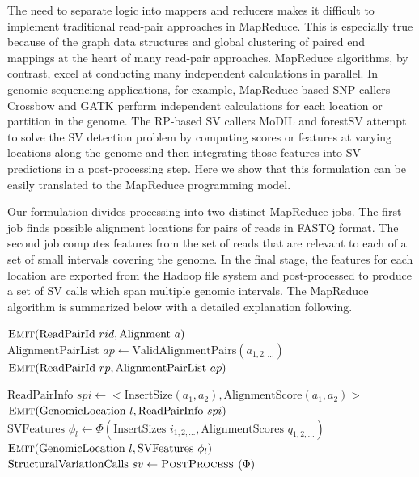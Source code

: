 \documentclass[11pt]{article}
\begin{document}
The need to separate logic into mappers and reducers makes it difficult to implement traditional read-pair approaches in MapReduce. This is especially true because of the graph data structures and global clustering of paired end mappings at the heart of many read-pair approaches. MapReduce algorithms, by contrast, excel at conducting many independent calculations in parallel. In genomic sequencing applications, for example, MapReduce based SNP-callers Crossbow \autocite{Langmead:2009p1225} and GATK \autocite{McKenna:2010p1051} perform independent calculations for each location or partition in the genome. The RP-based SV callers MoDIL \autocite{Lee:2009da} and forestSV \autocite{Michaelson:2012fj} attempt to solve the SV detection problem by computing scores or features at varying locations along the genome and then integrating those features into SV predictions in a post-processing step. Here we show that this formulation can be easily translated to the MapReduce programming model.

Our formulation divides processing into two distinct MapReduce jobs. The first job finds possible alignment locations for pairs of reads in FASTQ format. The second job computes features from the set of reads that are relevant to each of a set of small intervals covering the genome. In the final stage, the features for each location are exported from the Hadoop file system and post-processed to produce a set of SV calls which span multiple genomic intervals. The MapReduce algorithm is summarized below with a detailed explanation following.

\algrenewcommand{}
  \begin{algorithmic}[1]
    \State $\textsc{Emit}(\textrm{ReadPairId }rid, \textrm{Alignment }a)$
    \EndFor
    \EndFunction
    \State $\textrm{AlignmentPairList }ap \gets \textrm{ValidAlignmentPairs}(a_{1,2,\ldots})$
    \State $\textsc{Emit}(\textrm{ReadPairId }rp, \textrm{AlignmentPairList } ap)$
    \EndFunction
    \EndProcedure

    \State $ \textrm{ReadPairInfo }spi \gets <\textrm{InsertSize}(a_1,a_2), \textrm{AlignmentScore}(a_1,a_2)>$
    \State $\textsc{Emit}(\textrm{GenomicLocation }l, \textrm{ReadPairInfo }spi)$
    \EndFor
    \EndFor
    \EndFunction
    \State $\textrm{SVFeatures } \phi_l \gets \Phi(\textrm{InsertSizes }i_{1,2,\ldots}, \textrm{AlignmentScores }q_{1,2,\ldots})$
    \State $\textsc{Emit}(\textrm{GenomicLocation }l, \textrm{SVFeatures } \phi_l)$
    \EndFunction
    \EndProcedure
    \State $\textrm{StructuralVariationCalls } sv \gets \textsc{PostProcess }(\Phi)$ 
  \end{algorithmic}
\end{document}
